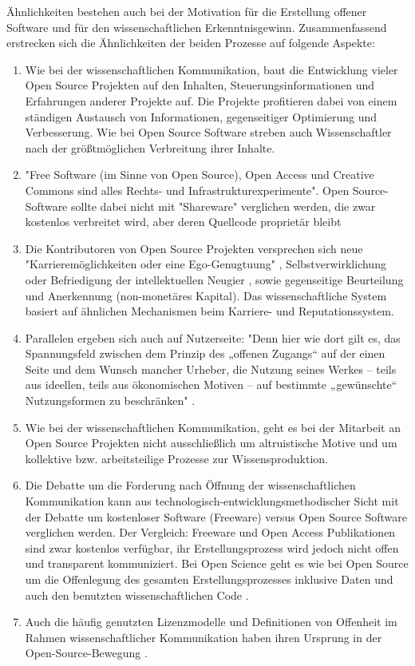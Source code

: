 Ähnlichkeiten bestehen auch bei der Motivation für die Erstellung offener Software und für den wissenschaftlichen Erkenntnisgewinn. Zusammenfassend erstrecken sich die Ähnlichkeiten der beiden Prozesse auf folgende Aspekte:
\begin{enumerate}
\item Wie bei der wissenschaftlichen Kommunikation, baut die Entwicklung vieler Open Source Projekten auf den Inhalten, Steuerungsinformationen und Erfahrungen anderer Projekte auf. Die Projekte profitieren dabei von einem ständigen Austausch von Informationen, gegenseitiger Optimierung und Verbesserung. Wie bei Open Source Software streben auch Wissenschaftler nach der größtmöglichen Verbreitung ihrer Inhalte.
\item "Free Software (im Sinne von Open Source), Open Access und Creative Commons sind alles Rechts- und Infrastrukturexperimente"\cite{kelty_2004}. Open Source-Software sollte dabei nicht mit "Shareware" verglichen werden, die zwar kostenlos verbreitet wird, aber deren Quellcode proprietär bleibt \cite{Lerner_2001}
\item Die Kontributoren von Open Source Projekten versprechen sich neue "Karrieremöglichkeiten oder eine Ego-Genugtuung" \cite{Lerner_2001}, Selbstverwirklichung oder Befriedigung der intellektuellen Neugier \cite{Willinsky_2005}, sowie gegenseitige Beurteilung und Anerkennung (non-monetäres Kapital). Das wissenschaftliche System basiert auf ähnlichen Mechanismen beim Karriere- und Reputationssystem.
\item Parallelen ergeben sich auch auf Nutzerseite: "Denn hier wie dort gilt es, das Spannungsfeld zwischen dem Prinzip des „offenen Zugangs“ auf der einen Seite und dem Wunsch mancher Urheber, die Nutzung seines Werkes – teils aus ideellen, teils aus ökonomischen Motiven – auf bestimmte „gewünschte“ Nutzungsformen zu beschränken" \cite{dorschel_2006_open}.
\item Wie bei der wissenschaftlichen Kommunikation, geht es bei der Mitarbeit an Open Source Projekten nicht ausschließlich um altruistische Motive \cite{Lerner_2001} und um kollektive bzw. arbeitsteilige Prozesse zur Wissensproduktion.
\item Die Debatte um die Forderung nach Öffnung der wissenschaftlichen Kommunikation kann aus technologisch-entwicklungsmethodischer Sicht mit der Debatte um kostenloser Software (Freeware) versus Open Source Software verglichen werden. Der Vergleich: Freeware und Open Access Publikationen sind zwar kostenlos verfügbar, ihr Erstellungsprozess wird jedoch nicht offen und transparent kommuniziert. Bei Open Science geht es wie bei Open Source um die Offenlegung des gesamten Erstellungsprozesses inklusive Daten \cite{grand_2012_open} und auch den benutzten wissenschaftlichen Code \cite{hey_2015_open}.
\item Auch die häufig genutzten Lizenzmodelle und Definitionen von Offenheit im Rahmen wissenschaftlicher Kommunikation haben ihren Ursprung in der Open-Source-Bewegung \cite{suchen}.
\end{enumerate}

